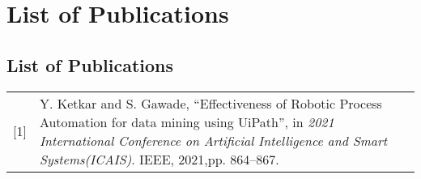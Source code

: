 \chapter*{List of Publications}
\thispagestyle{fancy}
\section*{\centering List of Publications}

\begin{table}[h]
  \centering
  \begin{tabular}{lp{417.25218pt}}
    [1] &
    Y. Ketkar and S. Gawade, ``Effectiveness of Robotic Process Automation for data mining using UiPath'', in \emph{2021 International Conference on Artificial Intelligence and Smart Systems(ICAIS)}. IEEE, 2021,pp. 864--867.
  \end{tabular}
\end{table}